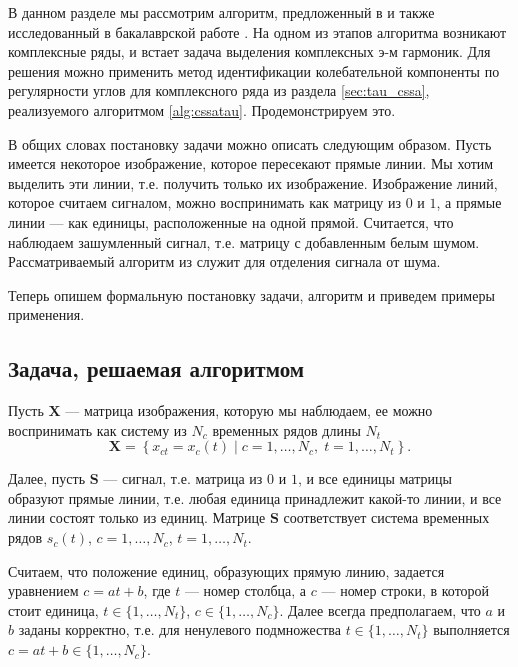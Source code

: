 \documentclass[specialist,
               substylefile = spbu.rtx,
               subf,href,colorlinks=true, 12pt]{disser}
\begin{document}
В данном разделе мы рассмотрим алгоритм, предложенный в \cite{Trickett2003} и также исследованный в бакалаврской работе \cite{Zhornikova2016}.
На одном из этапов алгоритма возникают комплексные ряды, и встает задача выделения комплексных э-м гармоник.
Для решения можно применить метод идентификации колебательной компоненты по регулярности углов для комплексного ряда из раздела \ref{sec:tau_cssa}, реализуемого алгоритмом \ref{alg:cssatau}. Продемонстрируем это.

В общих словах постановку задачи можно описать следующим образом. Пусть имеется некоторое изображение, которое пересекают прямые линии. Мы хотим выделить эти линии, т.е. получить только их изображение.
Изображение линий, которое считаем сигналом, можно воспринимать как матрицу из $0$ и $1$, а прямые линии --- как единицы, расположенные на одной прямой. Считается, что наблюдаем зашумленный сигнал, т.е. матрицу с добавленным белым шумом.
Рассматриваемый алгоритм из \cite{Trickett2003} служит для отделения сигнала от шума.

Теперь опишем формальную постановку задачи, алгоритм и приведем примеры применения.

\subsection{Задача, решаемая алгоритмом} \label{sec:chapter3_task}
Пусть $\mathbf{X}$ --- матрица изображения, которую мы наблюдаем, ее можно воспринимать как систему из $N_c$ временных рядов длины $N_t$
\begin{equation*}
	\mathbf{X}=\left\{x_{ct}=x_c(t) \; | \; c=1, \ldots, N_c, \; t=1, \ldots, N_t\right\}.
\end{equation*}

Далее, пусть $\mathbf{S}$ --- сигнал, т.е. матрица из $0$ и $1$, и все единицы матрицы образуют прямые линии, т.е. любая единица принадлежит какой-то линии, и все линии состоят только из единиц. Матрице $\mathbf{S}$ соответствует система временных рядов $s_c(t)$, $c=1, \ldots, N_c$, $t=1, \ldots, N_t$.

Считаем, что положение единиц, образующих прямую линию, задается уравнением $c = a t + b$, где $t$ --- номер столбца, а $c$ --- номер строки, в которой стоит единица, $t \in \{1,\ldots, N_t\}$, $c \in \{1,\ldots,N_c\}$.
Далее всегда предполагаем, что $a$ и $b$ заданы корректно, т.е. для ненулевого подмножества $t \in \{1,\ldots, N_t\}$ выполняется $c = a t + b \in \{1,\ldots,N_c\}$.
\end{document}
